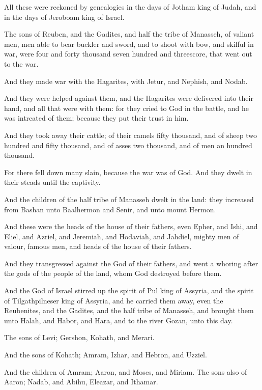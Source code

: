 \Verse All these were reckoned by genealogies in the days of Jotham king of Judah, and in the days of Jeroboam king of Israel.

\Verse The sons of Reuben, and the Gadites, and half the tribe of Manasseh, of valiant men, men able to bear buckler and sword, and to shoot with bow, and skilful in war, were four and forty thousand seven hundred and threescore, that went out to the war.

\Verse And they made war with the Hagarites, with Jetur, and Nephish, and Nodab.

\Verse And they were helped against them, and the Hagarites were delivered into their hand, and all that were with them: for they cried to God in the battle, and he was intreated of them; because they put their trust in him.

\Verse And they took away their cattle; of their camels fifty thousand, and of sheep two hundred and fifty thousand, and of asses two thousand, and of men an hundred thousand.

\Verse For there fell down many slain, because the war was of God. And they dwelt in their steads until the captivity.

\Verse And the children of the half tribe of Manasseh dwelt in the land: they increased from Bashan unto Baalhermon and Senir, and unto mount Hermon.

\Verse And these were the heads of the house of their fathers, even Epher, and Ishi, and Eliel, and Azriel, and Jeremiah, and Hodaviah, and Jahdiel, mighty men of valour, famous men, and heads of the house of their fathers.

\Verse And they transgressed against the God of their fathers, and went a whoring after the gods of the people of the land, whom God destroyed before them.

\Verse And the God of Israel stirred up the spirit of Pul king of Assyria, and the spirit of Tilgathpilneser king of Assyria, and he carried them away, even the Reubenites, and the Gadites, and the half tribe of Manasseh, and brought them unto Halah, and Habor, and Hara, and to the river Gozan, unto this day.


\Chapter
\Verse The sons of Levi; Gershon, Kohath, and Merari.

\Verse And the sons of Kohath; Amram, Izhar, and Hebron, and Uzziel.

\Verse And the children of Amram; Aaron, and Moses, and Miriam. The sons also of Aaron; Nadab, and Abihu, Eleazar, and Ithamar.

